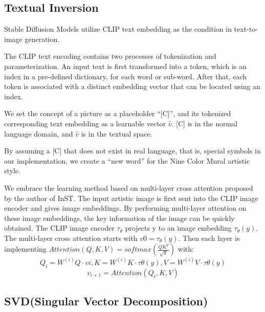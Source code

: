 \documentclass[conference]{IEEEtran}
\begin{document}
\subsection{Textual Inversion}

Stable Diffusion Models utilize CLIP text embedding as the condition in text-to-image generation. 

The CLIP text encoding contains two processes of tokenization and parameterization. An input text is first transformed into a token, which is an index in a pre-defined dictionary, for each word or sub-word. After that, each token is associated with a distinct embedding vector that can be located using an index. 

We set the concept of a picture as a placeholder “[C]”,  and its tokenized corresponding text embedding as a learnable vector $\hat{v}$. 
[C] is in the normal language domain, and $\hat{v}$ is in the textual space. 

By assuming a [C] that does not exist in real language, that is, special symbols in our implementation, we create a “new word” for the Nine Color Mural artistic style. 

We embrace the learning method based on multi-layer cross attention proposed by the author of InST.  The input artistic image is first sent into the CLIP image encoder and gives image embeddings. By performing multi-layer attention on these image embeddings, the key information of the image can be quickly obtained. The CLIP image encoder $\tau_\theta$  projects y to an image embedding $\tau_\theta(y)$. The multi-layer
cross attention starts with $v0 = \tau_\theta(y)$. Then each layer is
implementing $Attention(Q, K, V ) = softmax(\frac{QK^T}{\sqrt{d}})$
with:
$$
Q_i = W^{(i)}Q \cdot vi ,
K = W^{(i)}K \cdot τθ(y),  
V = W^{(i)}V \cdot τθ(y)
$$
$$
v_{i+1} = Attention(Q_i, K, V )
$$



\subsection{SVD(Singular Vector Decomposition)}
\end{document}
